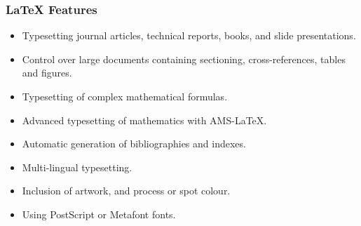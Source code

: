 \documentclass[11pt]{article}
\begin{document}
	\subsubsection*{LaTeX Features}
	\begin{itemize}
		\item Typesetting journal articles, technical reports, books, and slide presentations.
		\item Control over large documents containing sectioning, cross-references, tables and figures.
		\item Typesetting of complex mathematical formulas.
		\item Advanced typesetting of mathematics with AMS-LaTeX.
		\item Automatic generation of bibliographies and indexes.
		\item Multi-lingual typesetting.
		\item Inclusion of artwork, and process or spot colour.
		\item Using PostScript or Metafont fonts.
	\end{itemize}
	
	
	
\end{document}
